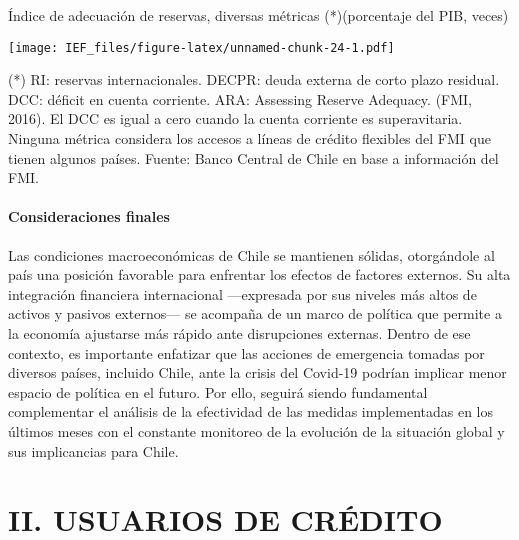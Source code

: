 \documentclass[
]{book}
\begin{document}
Índice de adecuación de reservas, diversas métricas (*)(porcentaje del PIB, veces)

\texttt{[image: IEF\_files/figure-latex/unnamed-chunk-24-1.pdf]}

(*) RI: reservas internacionales. DECPR: deuda externa de corto plazo residual. DCC: déficit en cuenta corriente. ARA: Assessing Reserve Adequacy. (FMI, 2016). El DCC es igual a cero cuando la cuenta corriente es superavitaria. Ninguna métrica considera los accesos a líneas de crédito flexibles del FMI que tienen algunos países.
Fuente: Banco Central de Chile en base a información del FMI.

\hypertarget{RI.15}{%
\subsubsection*{\texorpdfstring{\textbf{Consideraciones finales}}{Consideraciones finales}}\label{RI.15}}

Las condiciones macroeconómicas de Chile se mantienen sólidas,
otorgándole al país una posición favorable para enfrentar los
efectos de factores externos. Su alta integración financiera
internacional ---expresada por sus niveles más altos de activos
y pasivos externos--- se acompaña de un marco de política que
permite a la economía ajustarse más rápido ante disrupciones
externas.
Dentro de ese contexto, es importante enfatizar que las acciones
de emergencia tomadas por diversos países, incluido Chile, ante
la crisis del Covid-19 podrían implicar menor espacio de política
en el futuro. Por ello, seguirá siendo fundamental complementar
el análisis de la efectividad de las medidas implementadas en los
últimos meses con el constante monitoreo de la evolución de la
situación global y sus implicancias para Chile.

\hypertarget{UCR}{%
\chapter*{II. USUARIOS DE CRÉDITO}\label{UCR}}
\end{document}
